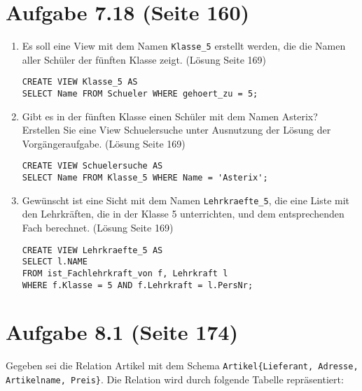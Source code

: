 \documentclass{lehramt-informatik-haupt}
\begin{document}
%

\section{Aufgabe 7.18 (Seite 160)}

\begin{enumerate}
\item Es soll eine View mit dem Namen \verb|Klasse_5| erstellt werden,
die die Namen aller Schüler der fünften Klasse zeigt. (Lösung Seite 169)

\begin{verbatim}
CREATE VIEW Klasse_5 AS
SELECT Name FROM Schueler WHERE gehoert_zu = 5;
\end{verbatim}

\item Gibt es in der fünften Klasse einen Schüler mit dem Namen Asterix?
Erstellen Sie eine View Schuelersuche unter Ausnutzung der Lösung der
Vorgängeraufgabe. (Lösung Seite 169)

\begin{verbatim}
CREATE VIEW Schuelersuche AS
SELECT Name FROM Klasse_5 WHERE Name = 'Asterix';
\end{verbatim}

\item Gewünscht ist eine Sicht mit dem Namen \verb|Lehrkraefte_5|, die
eine Liste mit den Lehrkräften, die in der Klasse 5 unterrichten, und
dem entsprechenden Fach berechnet. (Lösung Seite 169)

\begin{verbatim}
CREATE VIEW Lehrkraefte_5 AS
SELECT l.NAME
FROM ist_Fachlehrkraft_von f, Lehrkraft l
WHERE f.Klasse = 5 AND f.Lehrkraft = l.PersNr;
\end{verbatim}

\end{enumerate}

%

\section{Aufgabe 8.1 (Seite 174)}

Gegeben sei die Relation Artikel mit dem Schema
\texttt{Artikel\{Lieferant, Adresse, Artikelname, Preis\}}. Die
Relation wird durch folgende Tabelle repräsentiert:
\end{document}
